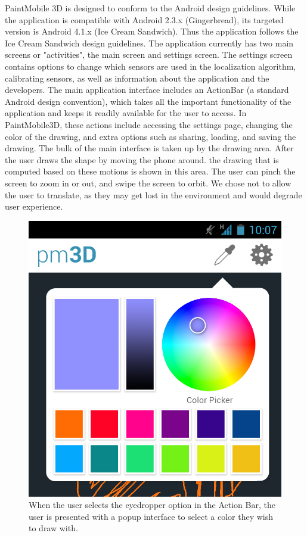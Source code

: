 \documentclass{chi-ext}
\begin{document}
PaintMobile 3D is designed to conform to the Android design guidelines. While the application is compatible with Android 2.3.x (Gingerbread), its targeted version is Android 4.1.x (Ice Cream Sandwich). Thus the application follows the Ice Cream Sandwich design guidelines. The application currently has two main screens or "activities", the main screen and settings screen. The settings screen contains options to change which sensors are used in the localization algorithm, calibrating sensors, as well as information about the application and the developers. The main application interface includes an ActionBar (a standard Android design convention), which takes all the important functionality of the application and keeps it readily available for the user to access. In PaintMobile3D, these actions include accessing the settings page, changing the color of the drawing, and extra options such as sharing, loading, and saving the drawing. The bulk of the main interface is taken up by the drawing area. After the user draws the shape by moving the phone around. the drawing that is computed based on these motions is shown in this area. The user can pinch the screen to zoom in or out, and swipe the screen to orbit. We chose not to allow the user to translate, as they may get lost in the environment and would degrade user experience. 

\begin{figure}
\hspace{\columnwidth}%
\parbox{\columnwidth}{
  \centering
  \includegraphics[width=\columnwidth]{colorpicker.jpg}
  \caption{When the user selects the eyedropper option in the Action Bar, the user is presented with a popup interface to select a color they wish to draw with.}
  \label{fig:colorpicker}
}
\end{figure}
\end{document}
